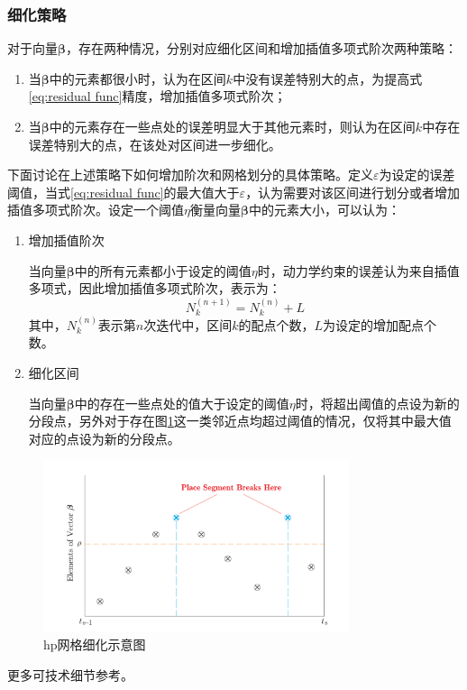 \subsubsection{细化策略}
对于向量$ \bm{\beta} $，存在两种情况，分别对应细化区间和增加插值多项式阶次两种策略：
\begin{enumerate}
	\item 当$ \bm{\beta} $中的元素都很小时，认为在区间$ k $中没有误差特别大的点，为提高式\eqref{eq:residual func}精度，增加插值多项式阶次；
	\item 当$ \bm{\beta} $中的元素存在一些点处的误差明显大于其他元素时，则认为在区间$ k $中存在误差特别大的点，在该处对区间进一步细化。
\end{enumerate}

下面讨论在上述策略下如何增加阶次和网格划分的具体策略。定义$ \varepsilon $为设定的误差阈值，当式\eqref{eq:residual func}的最大值大于$ \varepsilon $，认为需要对该区间进行划分或者增加插值多项式阶次。设定一个阈值$ \eta$衡量向量$ \bm{\beta} $中的元素大小，可以认为：
\begin{enumerate}
	\item 增加插值阶次\par
	      当向量$ \bm{\beta} $中的所有元素都小于设定的阈值$ \eta $时，动力学约束的误差认为来自插值多项式，因此增加插值多项式阶次，表示为：
	      \begin{equation}
		      N^{(n+1)}_k=N^{(n)}_k+L
	      \end{equation}
	      其中，$ N^{(n)}_k $表示第$ n $次迭代中，区间$ k $的配点个数，$ L $为设定的增加配点个数。
	\item 细化区间\par
	      当向量$ \bm{\beta} $中的存在一些点处的值大于设定的阈值$ \eta $时，将超出阈值的点设为新的分段点，另外对于存在图\ref{fig:hp-sketch}这一类邻近点均超过阈值的情况，仅将其中最大值对应的点设为新的分段点。
\end{enumerate}
\begin{figure}[htb]
	\begin{small}
		\begin{center}
			\includegraphics[width=0.8\textwidth]{figures/hp-sketch}
		\end{center}
		\caption{hp网格细化示意图}
		\label{fig:hp-sketch}
	\end{small}
\end{figure}
更多可技术细节参考。

